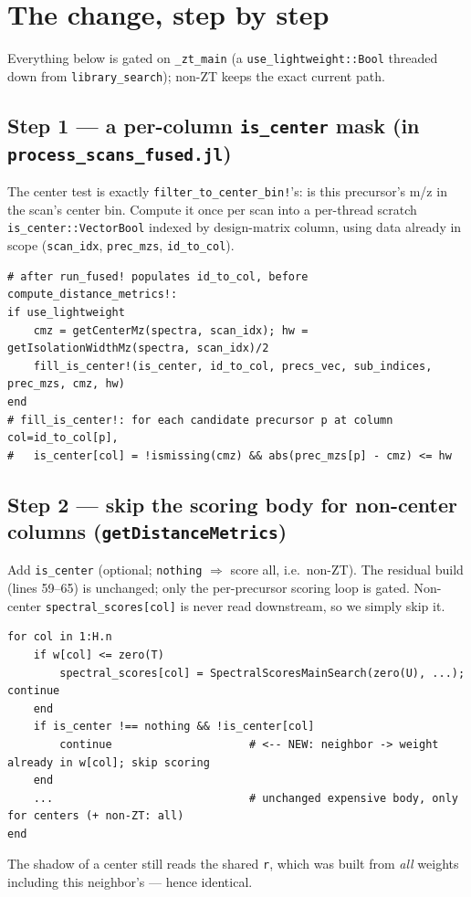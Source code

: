 \documentclass[11pt]{article}
\newcommand{\code}[1]{\texttt{\small #1}}
\begin{document}
\section{The change, step by step}

Everything below is gated on \code{\_zt\_main} (a \code{use\_lightweight::Bool}
threaded down from \code{library\_search}); non-ZT keeps the exact current path.

\subsection*{Step 1 --- a per-column \code{is\_center} mask (in \code{process\_scans\_fused.jl})}
The center test is exactly \code{filter\_to\_center\_bin!}'s: is this precursor's m/z in
the scan's center bin. Compute it once per scan into a per-thread scratch
\code{is\_center::Vector{Bool}} indexed by design-matrix column, using data already in
scope (\code{scan\_idx}, \code{prec\_mzs}, \code{id\_to\_col}).
\begin{lstlisting}[firstnumber=1]
# after run_fused! populates id_to_col, before compute_distance_metrics!:
if use_lightweight
    cmz = getCenterMz(spectra, scan_idx); hw = getIsolationWidthMz(spectra, scan_idx)/2
    fill_is_center!(is_center, id_to_col, precs_vec, sub_indices, prec_mzs, cmz, hw)
end
# fill_is_center!: for each candidate precursor p at column col=id_to_col[p],
#   is_center[col] = !ismissing(cmz) && abs(prec_mzs[p] - cmz) <= hw
\end{lstlisting}

\subsection*{Step 2 --- skip the scoring body for non-center columns (\code{getDistanceMetrics})}
Add \code{is\_center} (optional; \code{nothing} $\Rightarrow$ score all, i.e.\ non-ZT).
The residual build (lines 59--65) is unchanged; only the per-precursor scoring loop is
gated. Non-center \code{spectral\_scores[col]} is never read downstream, so we simply
skip it.
\begin{lstlisting}[firstnumber=1]
for col in 1:H.n
    if w[col] <= zero(T)
        spectral_scores[col] = SpectralScoresMainSearch(zero(U), ...); continue
    end
    if is_center !== nothing && !is_center[col]
        continue                     # <-- NEW: neighbor -> weight already in w[col]; skip scoring
    end
    ...                              # unchanged expensive body, only for centers (+ non-ZT: all)
end
\end{lstlisting}
The shadow of a center still reads the shared \code{r}, which was built from
\emph{all} weights including this neighbor's --- hence identical.
\end{document}
